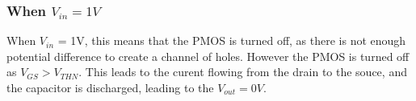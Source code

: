 \documentclass{article}
\begin{document}
\subsubsection*{When $V_{in} = 1V$}
When $V_{in}$ = 1V, this means that the PMOS is turned off, as there is not enough potential difference to create a channel of holes. However the PMOS is turned off as $V_{GS} > V_{THN}$.
This leads to the curent flowing from the drain to the souce, and the capacitor is discharged, leading to the $V_{out} = 0V$.
\end{document}
